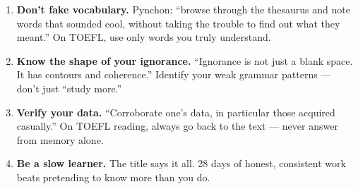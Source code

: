 \documentclass[10pt,a4paper]{article}
\begin{document}
\begin{tcolorbox}[colback=white, colframe=black,
    title=What Pynchon Teaches You About English]
\begin{enumerate}[nosep]
\item \textbf{Don't fake vocabulary.} Pynchon: ``browse through the
thesaurus and note words that sounded cool, without taking the
trouble to find out what they meant.'' On TOEFL, use only words you
truly understand.

\item \textbf{Know the shape of your ignorance.} ``Ignorance is not
just a blank space. It has contours and coherence.'' Identify your
weak grammar patterns --- don't just ``study more.''

\item \textbf{Verify your data.} ``Corroborate one's data, in
particular those acquired casually.'' On TOEFL reading, always go
back to the text --- never answer from memory alone.

\item \textbf{Be a slow learner.} The title says it all. 28 days
of honest, consistent work beats pretending to know more than you do.
\end{enumerate}
\end{tcolorbox}
\end{document}
